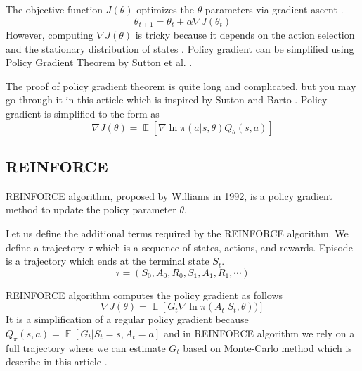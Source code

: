         The objective function $J(\theta)$ optimizes the $\theta$ parameters via gradient ascent \cite{deep-learning}. 
        \begin{equation}
            \theta_{t+1} = \theta_{t} + \alpha \nabla J(\theta_{t})
        \end{equation}
        However, computing $\nabla J(\theta)$ is tricky because it depends on the action selection and the stationary distribution of states \cite{policy-weng}. Policy gradient can be simplified using Policy Gradient Theorem by Sutton et al. \cite{policy-gradient}.
        
        The proof of policy gradient theorem is quite long and complicated, but you may go through it in this article \cite{policy-weng} which is inspired by Sutton and Barto \cite{rl-intro}. Policy gradient is simplified to the form as
        \begin{equation}
            \nabla J(\theta) = \mathop{\mathbb{E}}[ \nabla \ln \pi (a|s, \theta) Q_{\theta}(s, a)]
        \end{equation}
    
        \subsection{REINFORCE}\label{reinforce}
        REINFORCE algorithm, proposed by Williams \cite{reinforce} in 1992, is a policy gradient method to update the policy parameter $\theta$.
        
        Let us define the additional terms required by the REINFORCE algorithm. We define a trajectory $\tau$ which is a sequence of states, actions, and rewards. Episode is a trajectory which ends at the terminal state $S_t$.
        \begin{equation}
            \tau = (S_0, A_0, R_0, S_1, A_1, R_1, \cdots)
        \end{equation}
        
        REINFORCE algorithm computes the policy gradient as follows
        \begin{equation}
            \nabla J(\theta) = \mathop{\mathbb{E}}[ G_{t} \nabla \ln \pi (A_t|S_t, \theta))]
        \end{equation}
        It is a simplification of a regular policy gradient because $Q_{\pi}(s, a) = \mathop{\mathbb{E}}[G_t|S_t = s, A_t = a]$ and in REINFORCE algorithm we rely on a full trajectory where we can estimate $G_t$ based on Monte-Carlo method which is describe in this article \cite{rl-intro}.
        

